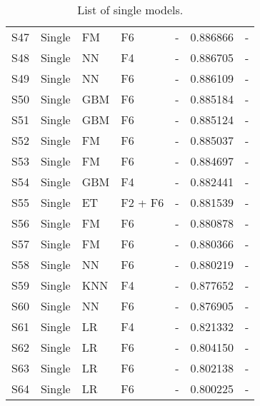 \begin{table*}[t]
\begin{center}
\begin{minipage}{\textwidth}
{\begin{tabular}{lllllll}
S47	& Single	& FM		& F6					& - 						& 0.886866	& - \\
S48	& Single	& NN		& F4					& - 						& 0.886705	& - \\
S49	& Single	& NN		& F6					& - 						& 0.886109	& - \\
S50 	& Single	& GBM		& F6					& - 						& 0.885184	& - \\
S51 	& Single	& GBM		& F6					& - 						& 0.885124	& - \\
S52 	& Single	& FM		& F6					& - 						& 0.885037	& - \\
S53	& Single	& FM		& F6					& - 						& 0.884697	& - \\
S54 	& Single	& GBM		& F4					& - 						& 0.882441	& - \\
S55	& Single	& ET			& F2 + F6				& - 						& 0.881539	& - \\
S56	& Single	& FM		& F6					& - 						& 0.880878	& - \\
S57	& Single	& FM		& F6					& - 						& 0.880366	& - \\
S58	& Single	& NN		& F6					& - 						& 0.880219	& - \\
S59	& Single	& KNN		& F4					& - 						& 0.877652	& - \\
S60	& Single	& NN		& F6					& - 						& 0.876905	& - \\
S61	& Single	& LR			& F4					& - 						& 0.821332	& - \\
S62	& Single	& LR			& F6					& - 						& 0.804150	& - \\
S63	& Single	& LR			& F6					& - 						& 0.802138	& - \\
S64	& Single	& LR			& F6					& - 						& 0.800225	& - \\
\end{tabular}
    }
    \hfill{}
    \caption{List of single models.}
    \label{tb:singleModels}
    \end{minipage}
\end{center}
\end{table*}

